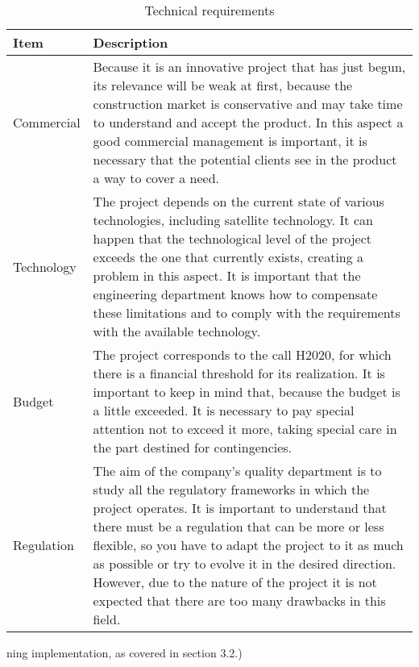 \begin{table}[H]
	\centering
	\begin{tabular}{l p{13.3cm}}
		
		\toprule[2pt]
		
		\textbf{Item} &  \textbf{Description}\\
		
		\midrule [1.5pt]
		
		Commercial & Because it is an innovative project that has just begun, its relevance will be weak at first, because the construction market is conservative and may take time to understand and accept the product.
		In this aspect a good commercial management is important, it is necessary that the potential clients see in the product a way to cover a need.
		\vspace{0.2cm}\\
		
		\midrule
		
		Technology & The project depends on the current state of various technologies, including satellite technology. It can happen that the technological level of the project exceeds the one that currently exists, creating a problem in this aspect. It is important that the engineering department knows how to compensate these limitations and to comply with the requirements with the available technology.\vspace{0.2cm}\\
		
		\midrule
		
		Budget & The project corresponds to the call H2020, for which there is a financial threshold for its realization. It is important to keep in mind that, because the budget is a little exceeded. It is necessary to pay special attention not to exceed it more, taking special care in the part destined for contingencies.\vspace{0.2cm}\\
		
		\midrule
		
		Regulation & The aim of the company's quality department is to study all the regulatory frameworks in which the project operates. It is important to understand that there must be a regulation that can be more or less flexible, so you have to adapt the project to it as much as possible or try to evolve it in the desired direction. However, due to the nature of the project it is not expected that there are too many drawbacks in this field.\vspace{0.2cm}\\
		
		
		\bottomrule[2pt]
		
	\end{tabular}
	\caption{Technical requirements}
\end{table}
ning implementation, as covered in section 3.2.)